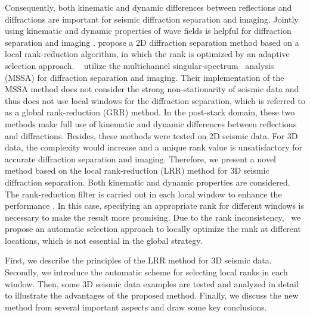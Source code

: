 \documentclass[10pt]{IEEEtran}
\begin{document}
Consequently, both kinematic and dynamic differences between reflections and diffractions are important for seismic diffraction separation and imaging. Jointly using kinematic and dynamic properties of wave fields is helpful for diffraction separation and imaging \cite{2010Separation}. 
\cite{2020Separation} propose a 2D diffraction separation method based on a local rank-reduction algorithm, in which the rank is optimized by an adaptive selection approach.  \cite{2020Diffraction} utilize the multichannel singular-spectrum  analysis (MSSA) for diffraction separation and imaging. Their implementation of the MSSA method does not consider the strong non-stationarity of seismic data and thus does not use local windows for the diffraction separation, which is referred to as a global rank-reduction (GRR) method. In the post-stack domain, these two methods make full use of kinematic and dynamic differences between reflections and diffractions. Besides, these methods were tested on 2D seismic data. For 3D data, the complexity would increase and a unique rank value is unsatisfactory for accurate diffraction separation and imaging. 
Therefore, we present a novel method based on the local rank-reduction (LRR) method for 3D seismic diffraction separation. Both kinematic and dynamic properties are considered. The rank-reduction filter is carried out in each local window to enhance the performance \cite{shaohuan2017gji,yangkang2017ieee,yangkang2019nc}. In this case, specifying an appropriate rank for different windows is necessary to make the result more promising. Due to the rank inconsistency,  we propose an automatic selection approach to locally optimize the rank at different locations, which is not essential in the global strategy. 

First, we describe the principles of the LRR method for 3D seismic data. Secondly, we introduce the automatic scheme for selecting local ranks in each window. Then, some 3D seismic data examples are tested and analyzed in detail to illustrate the advantages of the proposed method. Finally, we discuss the new method from several important aspects and draw some key conclusions.
\end{document}
